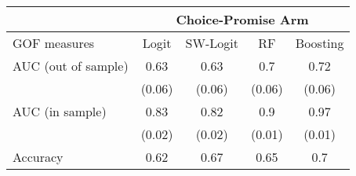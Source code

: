\begin{tabular}{lcccc}
\toprule
      & \multicolumn{4}{c}{Choice-Promise Arm} \\
\midrule
\midrule
GOF measures & Logit & SW-Logit & RF    & Boosting \\
\midrule
\midrule
AUC (out of sample) & 0.63  & 0.63  & 0.7   & 0.72 \\
      & (0.06) & (0.06) & (0.06) & (0.06) \\
AUC (in sample) & 0.83  & 0.82  & 0.9   & 0.97 \\
      & (0.02) & (0.02) & (0.01) & (0.01) \\
Accuracy & 0.62  & 0.67  & 0.65  & 0.7 \\
\bottomrule
\bottomrule
\end{tabular}%
